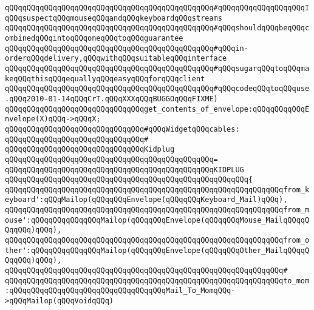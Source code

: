 \verb|qQQqqQQqqQQqqQQqqQQqqQQqqQQqqQQqqQQqqQQqqQQqqQQq#qQQqqQQqqQQqqQQqqQQqIqQQqsuspectqQQqmouseqQQqandqQQqkeyboardqQQqstreams|\newline
\verb|qQQqqQQqqQQqqQQqqQQqqQQqqQQqqQQqqQQqqQQqqQQqqQQq#qQQqshouldqQQqbeqQQqcombinedqQQqintoqQQqoneqQQqtoqQQqguarantee|\newline
\verb|qQQqqQQqqQQqqQQqqQQqqQQqqQQqqQQqqQQqqQQqqQQqqQQq#qQQqin-orderqQQqdelivery,qQQqwithqQQqsuitableqQQqinterface|\newline
\verb|qQQqqQQqqQQqqQQqqQQqqQQqqQQqqQQqqQQqqQQqqQQqqQQq#qQQqsugarqQQqtoqQQqmakeqQQqthisqQQqequallyqQQqeasyqQQqforqQQqclient|\newline
\verb|qQQqqQQqqQQqqQQqqQQqqQQqqQQqqQQqqQQqqQQqqQQqqQQq#qQQqcodeqQQqtoqQQquse.qQQq2010-01-14qQQqCrT.qQQqXXXqQQqBUGGOqQQqFIXME)|\newline
\newline
\verb|qQQqqQQqqQQqqQQqqQQqqQQqqQQqqQQqget_contents_of_envelope:qQQqqQQqqQQqEnvelope(X)qQQq->qQQqX;|\newline
\newline
\newline
\verb|qQQqqQQqqQQqqQQqqQQqqQQqqQQqqQQq#qQQqWidgetqQQqcables:|\newline
\verb|qQQqqQQqqQQqqQQqqQQqqQQqqQQqqQQq#|\newline
\verb|qQQqqQQqqQQqqQQqqQQqqQQqqQQqqQQqKidplug|\newline
\verb|qQQqqQQqqQQqqQQqqQQqqQQqqQQqqQQqqQQqqQQqqQQqqQQq=|\newline
\verb|qQQqqQQqqQQqqQQqqQQqqQQqqQQqqQQqqQQqqQQqqQQqqQQqKIDPLUG|\newline
\verb|qQQqqQQqqQQqqQQqqQQqqQQqqQQqqQQqqQQqqQQqqQQqqQQqqQQqqQQq{|\newline
\verb|qQQqqQQqqQQqqQQqqQQqqQQqqQQqqQQqqQQqqQQqqQQqqQQqqQQqqQQqqQQqqQQqfrom_keyboard':qQQqMailop(qQQqqQQqEnvelope(qQQqqQQqKeyboard_Mail)qQQq),|\newline
\verb|qQQqqQQqqQQqqQQqqQQqqQQqqQQqqQQqqQQqqQQqqQQqqQQqqQQqqQQqqQQqqQQqfrom_mouse':qQQqqQQqqQQqqQQqMailop(qQQqqQQqEnvelope(qQQqqQQqMouse_MailqQQqqQQqqQQq)qQQq),|\newline
\verb|qQQqqQQqqQQqqQQqqQQqqQQqqQQqqQQqqQQqqQQqqQQqqQQqqQQqqQQqqQQqqQQqfrom_other':qQQqqQQqqQQqqQQqMailop(qQQqqQQqEnvelope(qQQqqQQqOther_MailqQQqqQQqqQQq)qQQq),|\newline
\verb|qQQqqQQqqQQqqQQqqQQqqQQqqQQqqQQqqQQqqQQqqQQqqQQqqQQqqQQqqQQqqQQq#|\newline
\verb|qQQqqQQqqQQqqQQqqQQqqQQqqQQqqQQqqQQqqQQqqQQqqQQqqQQqqQQqqQQqqQQqto_mom:qQQqqQQqqQQqqQQqqQQqqQQqqQQqqQQqqQQqMail_To_MomqQQq->qQQqMailop(qQQqVoidqQQq)|\newline

